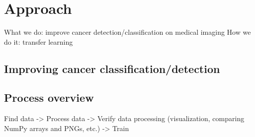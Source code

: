 
\chapter{Approach}
\label{ch:approach}

What we do: improve cancer detection/classification on medical imaging
How we do it: transfer learning

\section{Improving cancer classification/detection}


\section{Process overview}

Find data -> Process data -> Verify data processing (visualization, comparing NumPy arrays and PNGs, etc.) -> Train 
